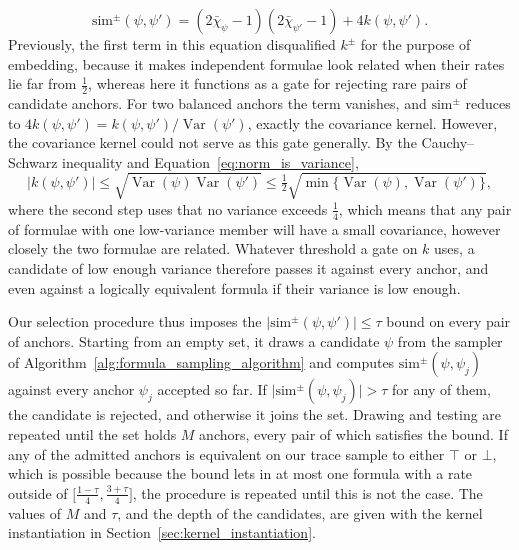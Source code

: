 \documentclass[titlepage,a4paper,11pt]{report}
\begin{document}
    \begin{equation}\label{eq:sim_pm_decomposition}
        \mathrm{sim}^\pm(\psi,\psi')=(2\bar\chi_\psi-1)(2\bar\chi_{\psi'}-1)+4k(\psi,\psi').
    \end{equation}
    Previously, the first term in this equation disqualified $k^\pm$ for the purpose of embedding, because it makes independent formulae look related when their rates lie far from $\tfrac12$, whereas here it functions as a gate for rejecting rare pairs of candidate anchors. For two balanced anchors the term vanishes, and $\mathrm{sim}^\pm$ reduces to $4k(\psi,\psi')=k(\psi,\psi')/\operatorname{Var}(\psi')$, exactly the covariance kernel. However, the covariance kernel could not serve as this gate generally. By the Cauchy--Schwarz inequality and Equation~\eqref{eq:norm_is_variance},
    \begin{equation}\label{eq:covariance_gate}
        \lvert k(\psi,\psi')\rvert\le\sqrt{\operatorname{Var}(\psi)\operatorname{Var}(\psi')}\le\tfrac12\sqrt{\min\{\operatorname{Var}(\psi),\operatorname{Var}(\psi')\}},
    \end{equation}
    where the second step uses that no variance exceeds $\tfrac14$, which means that any pair of formulae with one low-variance member will have a small covariance, however closely the two formulae are related. Whatever threshold a gate on $k$ uses, a candidate of low enough variance therefore passes it against every anchor, and even against a logically equivalent formula if their variance is low enough.

    Our selection procedure thus imposes the $\lvert\mathrm{sim}^\pm(\psi,\psi')\rvert\le\tau$ bound on every pair of anchors. Starting from an empty set, it draws a candidate $\psi$ from the sampler of Algorithm~\ref{alg:formula_sampling_algorithm} and computes $\mathrm{sim}^\pm(\psi,\psi_j)$ against every anchor $\psi_j$ accepted so far. If $\lvert\mathrm{sim}^\pm(\psi,\psi_j)\rvert>\tau$ for any of them, the candidate is rejected, and otherwise it joins the set. Drawing and testing are repeated until the set holds $M$ anchors, every pair of which satisfies the bound. If any of the admitted anchors is equivalent on our trace sample to either $\top$ or $\bot$, which is possible because the bound lets in at most one formula with a rate outside of $\bigl[\frac{1-\tau}{4},\frac{3+\tau}{4}\bigr]$, the procedure is repeated until this is not the case. The values of $M$ and $\tau$, and the depth of the candidates, are given with the kernel instantiation in Section~\ref{sec:kernel_instantiation}. 
    
\end{document}

